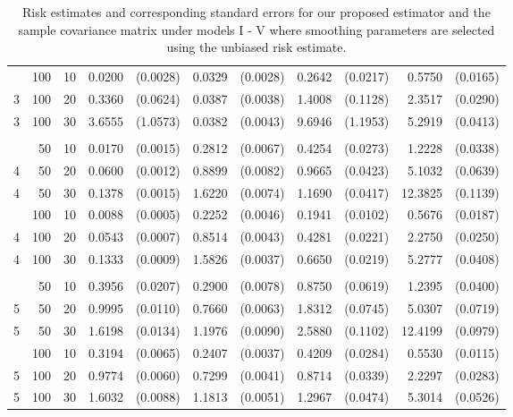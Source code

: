 \documentclass[12pt]{article}
\theoremstyle{definition}
\begin{document}
\begin{table}[H]
\begin{tabular}{lrrrrrrrrrr}
      \hdashline
  3 & 100 & 10 & 0.0200 &(0.0028) & 0.0329 & (0.0028) & 0.2642 & (0.0217) & 0.5750 & (0.0165) \\ 
  3 & 100 & 20 & 0.3360 & (0.0624) & 0.0387 & (0.0038) & 1.4008 & (0.1128) & 2.3517 & (0.0290) \\ 
  3 & 100 & 30 & 3.6555 & (1.0573) & 0.0382 & (0.0043) & 9.6946 & (1.1953) & 5.2919 & (0.0413) \\ 
      \hdashline \\
      \hdashline
  4 & 50 & 10 & 0.0170 & (0.0015) & 0.2812 & (0.0067) & 0.4254 & (0.0273) & 1.2228 & (0.0338) \\ 
  4 & 50 & 20 & 0.0600 & (0.0012) & 0.8899 & (0.0082) & 0.9665 & (0.0423) & 5.1032 & (0.0639) \\ 
  4 & 50 & 30 & 0.1378 & (0.0015) & 1.6220 & (0.0074) & 1.1690 & (0.0417) & 12.3825 & (0.1139) \\ 
      \hdashline
  4 & 100 & 10 & 0.0088 & (0.0005) & 0.2252 & (0.0046) & 0.1941 & (0.0102) & 0.5676 & (0.0187) \\ 
  4 & 100 & 20 & 0.0543 & (0.0007) & 0.8514 & (0.0043) & 0.4281 & (0.0221) & 2.2750 & (0.0250) \\ 
  4 & 100 & 30 & 0.1333 & (0.0009) & 1.5826 & (0.0037) & 0.6650 & (0.0219) & 5.2777 & (0.0408) \\ 
      \hdashline \\
      \hdashline
  5 & 50 & 10 & 0.3956 & (0.0207) & 0.2900 & (0.0078) & 0.8750 & (0.0619) & 1.2395 & (0.0400) \\ 
  5 & 50 & 20 & 0.9995 & (0.0110) & 0.7660 & (0.0063) & 1.8312 & (0.0745) & 5.0307 & (0.0719) \\ 
  5 & 50 & 30 & 1.6198 & (0.0134) & 1.1976 & (0.0090) & 2.5880 & (0.1102) & 12.4199 & (0.0979) \\ 
      \hdashline
  5 & 100 & 10 & 0.3194 & (0.0065) & 0.2407 & (0.0037) & 0.4209 & (0.0284) & 0.5530 & (0.0115) \\ 
  5 & 100 & 20 & 0.9774 & (0.0060) & 0.7299 & (0.0041) & 0.8714 & (0.0339) & 2.2297 & (0.0283) \\ 
  5 & 100 & 30 & 1.6032 & (0.0088) & 1.1813 & (0.0051) & 1.2967 & (0.0474) & 5.3014 & (0.0526) \\ 
   \hline
\end{tabular}
\caption{Risk estimates and corresponding standard errors for our proposed estimator and the sample covariance matrix under models I - V where smoothing parameters are selected using the unbiased risk estimate.} 
\end{table}
\end{document}
